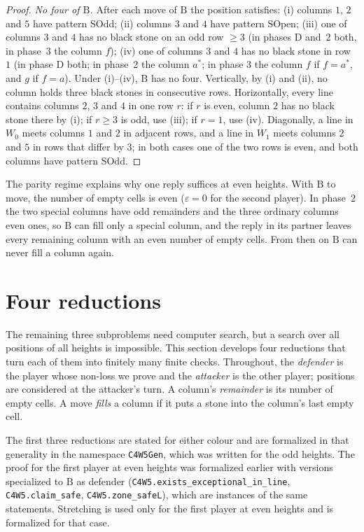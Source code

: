 \documentclass[11pt,a4paper]{article}
\theoremstyle{plain}
\theoremstyle{definition}
\newcommand{\code}[1]{{\upshape\texttt{\small\nolinkurl{#1}}}}
\newcommand{\B}{\mathrm{B}}
\newcommand{\eps}{\varepsilon}
\begin{document}
\begin{proof}
\emph{No four of $\B$.} After each move of $\B$ the position satisfies:
(i) columns $1$, $2$ and $5$ have pattern $\mathrm{SOdd}$;
(ii) columns $3$ and $4$ have pattern $\mathrm{SOpen}$;
(iii) one of columns $3$ and $4$ has no black stone on an odd row $\ge 3$ (in phases D and~2 both, in phase~3 the column $f$);
(iv) one of columns $3$ and $4$ has no black stone in row $1$ (in phase D both; in phase~2 the column $a^*$; in phase 3 the column $f$ if $f=a^*$, and $g$ if $f=a$).
Under (i)--(iv), $\B$ has no four. Vertically, by (i) and (ii), no column holds three black stones in consecutive rows. Horizontally, every line contains columns $2$, $3$ and $4$ in one row $r$: if $r$ is even, column $2$ has no black stone there by (i); if $r\ge 3$ is odd, use (iii); if $r=1$, use (iv). Diagonally, a line in $W_0$ meets columns $1$ and $2$ in adjacent rows, and a line in $W_1$ meets columns $2$ and $5$ in rows that differ by $3$; in both cases one of the two rows is even, and both columns have pattern $\mathrm{SOdd}$.
\end{proof}

The parity regime explains why one reply suffices at even heights. With $\B$ to move, the number of empty cells is even ($\eps=0$ for the second player). In phase~2 the two special columns have odd remainders and the three ordinary columns even ones, so $\B$ can fill only a special column, and the reply in its partner leaves every remaining column with an even number of empty cells. From then on $\B$ can never fill a column again.

\section{Four reductions}
\label{sec:tools}

The remaining three subproblems need computer search, but a search over all positions of all heights is impossible. This section develops four reductions that turn each of them into finitely many finite checks. Throughout, the \emph{defender} is the player whose non-loss we prove and the \emph{attacker} is the other player; positions are considered at the attacker's turn. A column's \emph{remainder} is its number of empty cells. A move \emph{fills} a column if it puts a stone into the column's last empty cell.

The first three reductions are stated for either colour and are formalized in that generality in the namespace \code{C4W5Gen}, which was written for the odd heights. The proof for the first player at even heights was formalized earlier with versions specialized to $\B$ as defender (\code{C4W5.exists_exceptional_in_line}, \code{C4W5.claim_safe}, \code{C4W5.zone_safeL}), which are instances of the same statements. Stretching is used only for the first player at even heights and is formalized for that case.
\end{document}
